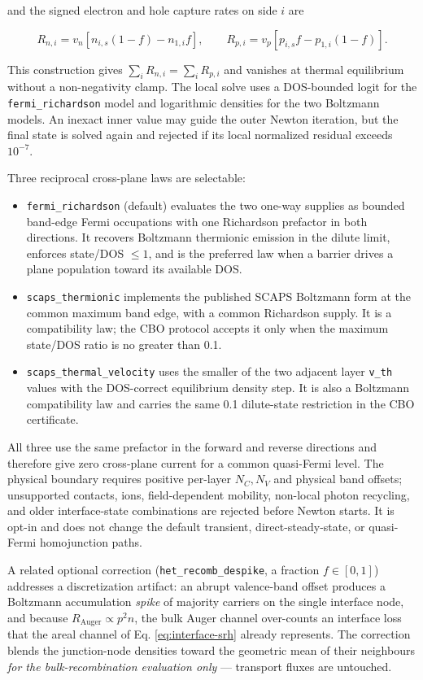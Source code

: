 \documentclass[
  11pt,
  american,
]{report}
\providecommand{\tightlist}{%
  \setlength{\itemsep}{0pt}\setlength{\parskip}{0pt}}
\begin{document}
and the signed electron and hole capture rates on side \(i\) are

\[
R_{n,i}=v_n[n_{i,s}(1-f)-n_{1,i}f],\qquad
R_{p,i}=v_p[p_{i,s}f-p_{1,i}(1-f)].
\]

This construction gives \(\sum_iR_{n,i}=\sum_iR_{p,i}\) and vanishes at
thermal equilibrium without a non-negativity clamp. The local solve uses
a DOS-bounded logit for the \texttt{fermi\_richardson} model and
logarithmic densities for the two Boltzmann models. An inexact inner
value may guide the outer Newton iteration, but the final state is
solved again and rejected if its local normalized residual exceeds
\(10^{-7}\).

Three reciprocal cross-plane laws are selectable:

\begin{itemize}
\tightlist
\item
  \texttt{fermi\_richardson} (default) evaluates the two one-way
  supplies as bounded band-edge Fermi occupations with one Richardson
  prefactor in both directions. It recovers Boltzmann thermionic
  emission in the dilute limit, enforces state/DOS \(\leq 1\), and is
  the preferred law when a barrier drives a plane population toward its
  available DOS.
\item
  \texttt{scaps\_thermionic} implements the published SCAPS Boltzmann
  form at the common maximum band edge, with a common Richardson supply.
  It is a compatibility law; the CBO protocol accepts it only when the
  maximum state/DOS ratio is no greater than 0.1.
\item
  \texttt{scaps\_thermal\_velocity} uses the smaller of the two adjacent
  layer \texttt{v\_th} values with the DOS-correct equilibrium density
  step. It is also a Boltzmann compatibility law and carries the same
  0.1 dilute-state restriction in the CBO certificate.
\end{itemize}

All three use the same prefactor in the forward and reverse directions
and therefore give zero cross-plane current for a common quasi-Fermi
level. The physical boundary requires positive per-layer \(N_C,N_V\) and
physical band offsets; unsupported contacts, ions, field-dependent
mobility, non-local photon recycling, and older interface-state
combinations are rejected before Newton starts. It is opt-in and does
not change the default transient, direct-steady-state, or quasi-Fermi
homojunction paths.

A related optional correction (\texttt{het\_recomb\_despike}, a fraction
\(f \in [0,1]\)) addresses a discretization artifact: an abrupt
valence-band offset produces a Boltzmann accumulation \emph{spike} of
majority carriers on the single interface node, and because
\(R_\mathrm{Auger} \propto p^2 n\), the bulk Auger channel over-counts
an interface loss that the areal channel of Eq. \ref{eq:interface-srh}
already represents. The correction blends the junction-node densities
toward the geometric mean of their neighbours \emph{for the
bulk-recombination evaluation only} --- transport fluxes are untouched.
\end{document}
